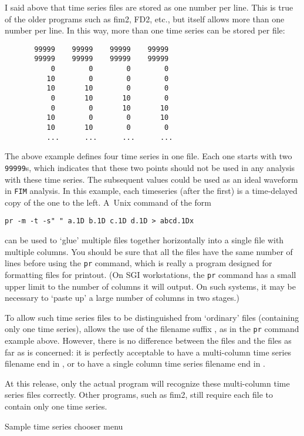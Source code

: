 I said above that time series files are stored as one number per line.
This is true of the older programs such as {\sf fim2}, {\sf FD2}, etc\@.,
but \afnit itself allows more than one number per line.  In this way, more
than one time series can be stored per file:
\begin{samepage}\begin{verbatim}
       99999    99999    99999    99999
       99999    99999    99999    99999
           0        0        0        0
          10        0        0        0
          10       10        0        0
           0       10       10        0
           0        0       10       10
          10        0        0       10
          10       10        0        0
          ...      ...      ...      ...
\end{verbatim}\end{samepage}
The above example defines four time series in one file.  Each one
starts with two {\tt 99999}s, which indicates that these two points
should not be used in any analysis with these time series.
The subsequent values could be used as an ideal waveform in {\tt FIM}
analysis.  In this example, each timeseries (after the first) is a time-delayed copy
of the one to the left.
A~Unix command of the form\\[1ex]
\centerline{\tt pr -m -t -s" " a.1D b.1D c.1D d.1D > abcd.1Dx}\vspace{1ex}
can be used to `glue' multiple files together horizontally
into a single file with multiple columns.  You should be sure that all the files have the
same number of lines before using the {\tt pr} command, which is
really a program designed for formatting files for printout.
(On SGI workstations, the {\tt pr} command has a small upper limit
to the number of columns it will output.  On such systems, it may
be necessary to `paste up' a large number of columns in two stages.)

To allow such time series files to be distinguished from `ordinary' files
(containing only one time series), \afnit allows the use of the filename
suffix , as in the {\tt pr} command example above.
However, there is no difference between the  files and
the  files as far as \afnit is concerned: it is perfectly
acceptable to have a multi-column time series filename end
in , or to have a single column time series filename end
in .

At this release, only the actual \afnit program will recognize
these multi-column time series files correctly.  Other programs, such
as {\sf fim2}, still require each file to contain only one time series.
\vspace{2ex}\goodbreak\begin{samepage}
\centerline{\epsfxsize=2.5in}\vspace{1ex}
\centerline{\sf Sample time series chooser menu}
\end{samepage}\goodbreak


